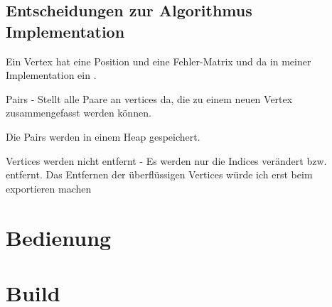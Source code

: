 \documentclass[a4paper,12pt]{book}
\begin{document}
\subsection*{Entscheidungen zur Algorithmus Implementation}

Ein Vertex hat eine Position und eine Fehler-Matrix und da in meiner Implementation ein .

Pairs - Stellt alle Paare an vertices da, die zu einem neuen Vertex zusammengefasst werden können. 

Die Pairs werden in einem Heap gespeichert.

Vertices werden nicht entfernt - Es werden nur die Indices verändert bzw. entfernt. Das Entfernen der überflüssigen Vertices würde ich erst beim exportieren machen

\section*{Bedienung}

\section*{Build}
\end{document}
